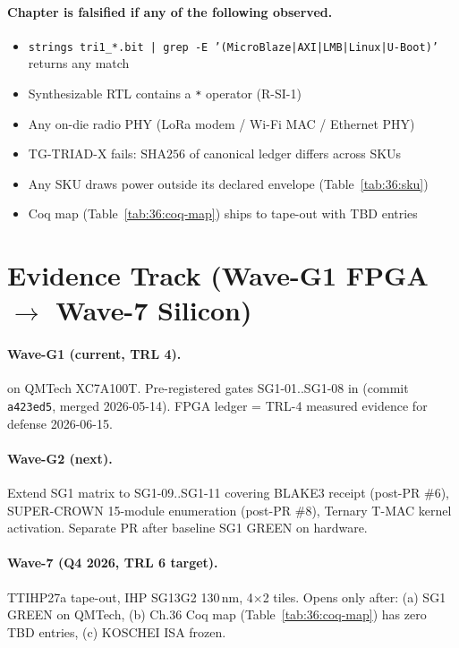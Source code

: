 \paragraph{Chapter is falsified if any of the following observed.}
\begin{itemize}
  \item \texttt{strings tri1\_*.bit | grep -E '(MicroBlaze|AXI|LMB|Linux|U-Boot)'} returns any match
  \item Synthesizable RTL contains a \texttt{*} operator (R-SI-1)
  \item Any on-die radio PHY (LoRa modem / Wi-Fi MAC / Ethernet PHY)
  \item TG-TRIAD-X fails: $\mathrm{SHA256}$ of canonical ledger differs across SKUs
  \item Any SKU draws power outside its declared envelope (Table~\ref{tab:36:sku})
  \item Coq map (Table~\ref{tab:36:coq-map}) ships to tape-out with TBD entries
\end{itemize}

\section{Evidence Track (Wave-G1 FPGA $\to$ Wave-7 Silicon)}
\label{sec:36:evidence}

\paragraph{Wave-G1 (current, TRL 4).}
 on QMTech XC7A100T. Pre-registered
gates SG1-01..SG1-08 in 
(commit \texttt{a423ed5}, merged 2026-05-14). FPGA ledger = TRL-4 measured
evidence for defense 2026-06-15.

\paragraph{Wave-G2 (next).}
Extend SG1 matrix to SG1-09..SG1-11 covering BLAKE3 receipt (post-PR \#6),
SUPER-CROWN 15-module enumeration (post-PR \#8), Ternary T-MAC kernel
activation. Separate PR after baseline SG1 GREEN on hardware.

\paragraph{Wave-7 (Q4 2026, TRL 6 target).}
TTIHP27a tape-out, IHP SG13G2 130\,nm, 4$\times$2 tiles. Opens only after:
(a) SG1 GREEN on QMTech, (b) Ch.36 Coq map (Table~\ref{tab:36:coq-map}) has
zero TBD entries, (c) KOSCHEI ISA frozen.

